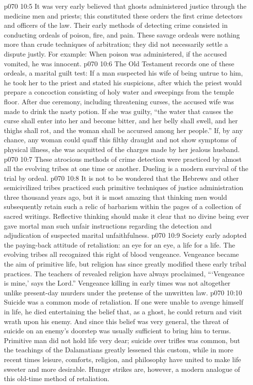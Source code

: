 \vs p070 10:5 It was very early believed that ghosts administered justice through the medicine men and priests; this constituted these orders the first crime detectors and officers of the law. Their early methods of detecting crime consisted in conducting ordeals of poison, fire, and pain. These savage ordeals were nothing more than crude techniques of arbitration; they did not necessarily settle a dispute justly. For example: When poison was administered, if the accused vomited, he was innocent.
\vs p070 10:6 The Old Testament records one of these ordeals, a marital guilt test: If a man suspected his wife of being untrue to him, he took her to the priest and stated his suspicions, after which the priest would prepare a concoction consisting of holy water and sweepings from the temple floor. After due ceremony, including threatening curses, the accused wife was made to drink the nasty potion. If she was guilty, “the water that causes the curse shall enter into her and become bitter, and her belly shall swell, and her thighs shall rot, and the woman shall be accursed among her people.” If, by any chance, any woman could quaff this filthy draught and not show symptoms of physical illness, she was acquitted of the charges made by her jealous husband.
\vs p070 10:7 These atrocious methods of crime detection were practiced by almost all the evolving tribes at one time or another. Dueling is a modern survival of the trial by ordeal.
\vs p070 10:8 It is not to be wondered that the Hebrews and other semicivilized tribes practiced such primitive techniques of justice administration three thousand years ago, but it is most amazing that thinking men would subsequently retain such a relic of barbarism within the pages of a collection of sacred writings. Reflective thinking should make it clear that no divine being ever gave mortal man such unfair instructions regarding the detection and adjudication of suspected marital unfaithfulness.
\pc \vs p070 10:9 Society early adopted the paying\hyp{}back attitude of retaliation: an eye for an eye, a life for a life. The evolving tribes all recognized this right of blood vengeance. Vengeance became the aim of primitive life, but religion has since greatly modified these early tribal practices. The teachers of revealed religion have always proclaimed, “‘Vengeance is mine,’ says the Lord.” Vengeance killing in early times was not altogether unlike present\hyp{}day murders under the pretense of the unwritten law.
\vs p070 10:10 Suicide was a common mode of retaliation. If one were unable to avenge himself in life, he died entertaining the belief that, as a ghost, he could return and visit wrath upon his enemy. And since this belief was very general, the threat of suicide on an enemy’s doorstep was usually sufficient to bring him to terms. Primitive man did not hold life very dear; suicide over trifles was common, but the teachings of the Dalamatians greatly lessened this custom, while in more recent times leisure, comforts, religion, and philosophy have united to make life sweeter and more desirable. Hunger strikes are, however, a modern analogue of this old\hyp{}time method of retaliation.
